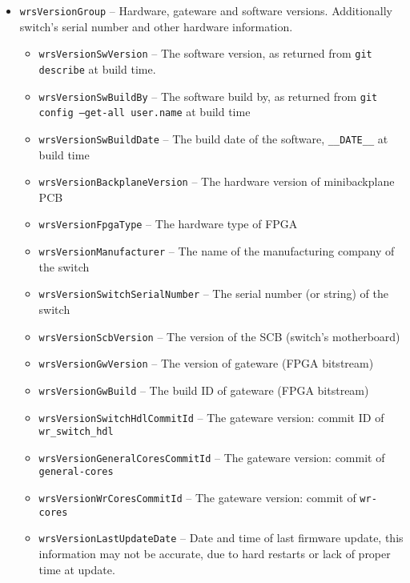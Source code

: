 \begin{itemize}
\begin{itemize}
\begin{itemize}
	\end{itemize}
    \end{itemize}
  \item \texttt{wrsVersionGroup} -- Hardware, gateware and software versions.
	Additionally switch's serial number and other hardware information.
    \begin{itemize}
      \item \texttt{wrsVersionSwVersion} -- The software version, as returned
	    from \texttt{git describe} at build time.
      \item \texttt{wrsVersionSwBuildBy} -- The software build by, as returned
	    from \texttt{git config --get-all user.name} at build time
      \item \texttt{wrsVersionSwBuildDate} -- The build date of the software,
	    \texttt{\_\_DATE\_\_} at build time
      \item \texttt{wrsVersionBackplaneVersion} -- The hardware version of
	    minibackplane PCB
      \item \texttt{wrsVersionFpgaType} -- The hardware type of FPGA
      \item \texttt{wrsVersionManufacturer} -- The name of the manufacturing
	    company of the switch
      \item \texttt{wrsVersionSwitchSerialNumber} -- The serial number (or
	    string) of the switch
      \item \texttt{wrsVersionScbVersion} -- The version of the SCB (switch's
	    motherboard)
      \item \texttt{wrsVersionGwVersion} -- The version of gateware (FPGA
	    bitstream)
      \item \texttt{wrsVersionGwBuild} -- The build ID of gateware (FPGA
	    bitstream)
      \item \texttt{wrsVersionSwitchHdlCommitId} -- The gateware version:
	    commit ID of \texttt{wr\_switch\_hdl}
      \item \texttt{wrsVersionGeneralCoresCommitId} -- The gateware version:
	    commit of \texttt{general-cores}
      \item \texttt{wrsVersionWrCoresCommitId} -- The gateware version: commit
	    of \texttt{wr-cores}
      \item \texttt{wrsVersionLastUpdateDate} -- Date and time of last firmware
	    update, this information may not be accurate, due to hard restarts
	    or lack of proper time at update.
    \end{itemize}
\end{itemize}

